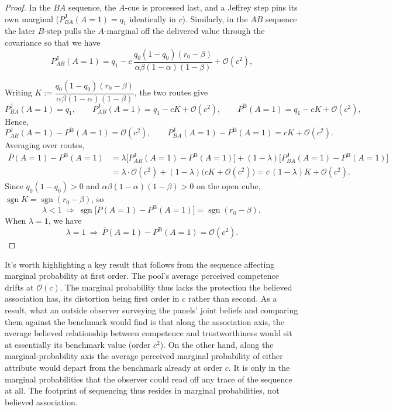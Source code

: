 \documentclass[a4paper,fleqn]{cas-sc}
\theoremstyle{remark}
\theoremstyle{definition}
\newcommand{\PB}{P^{\mathrm{B}}}
\newcommand{\PJ}{P^{\mathrm{J}}}
\newcommand{\Pbar}{\overline{P}}
\newcommand{\sgn}{\operatorname{sgn}}
\newcommand{\bigO}{\mathcal{O}}
\begin{document}
\begin{proof}
In the $BA$ sequence, the $A$-cue is processed last, and a Jeffrey step pins its own marginal ($\PJ_{BA}(A{=}1)=q_{1}$ identically
in $c$). Similarly, in the $AB$ sequence the later $B$-step pulls the $A$-marginal off the delivered value
through the covariance so that we have
\[
  \PJ_{AB}(A{=}1)=q_{1}-c\,\frac{q_{0}(1-q_{0})(r_{0}-\beta)}{\alpha\beta(1-\alpha)(1-\beta)}
  +\bigO(c^{2}),
\]

Writing $K:=\dfrac{q_0(1-q_0)(r_0-\beta)}{\alpha\beta(1-\alpha)(1-\beta)}$, the two routes give
\[
  \PJ_{BA}(A{=}1)=q_1,
  \qquad
  \PJ_{AB}(A{=}1)=q_1-cK+\bigO(c^2),
  \qquad
  \PB(A{=}1)=q_1-cK+\bigO(c^2),
\]
Hence,
\[
  \PJ_{AB}(A{=}1)-\PB(A{=}1)=\bigO(c^2),
  \qquad
  \PJ_{BA}(A{=}1)-\PB(A{=}1)=cK+\bigO(c^2).
\]
Averaging over routes,
\begin{align*}
  \Pbar(A{=}1)-\PB(A{=}1)
   &=\lambda\bigl[\PJ_{AB}(A{=}1)-\PB(A{=}1)\bigr]+(1-\lambda)\bigl[\PJ_{BA}(A{=}1)-\PB(A{=}1)\bigr]\\
   &=\lambda\cdot\bigO(c^2)+(1-\lambda)\bigl(cK+\bigO(c^2)\bigr)
    =c\,(1-\lambda)K+\bigO(c^2).
\end{align*}
Since $q_0(1-q_0)>0$ and $\alpha\beta(1-\alpha)(1-\beta)>0$ on the open cube, $\sgn K=\sgn(r_0-\beta)$, so
\[
  \lambda<1
  \ \Longrightarrow\
  \sgn\bigl[\Pbar(A{=}1)-\PB(A{=}1)\bigr]=\sgn(r_0-\beta),
  \]
  When $\lambda = 1$, we have
 \[
  \lambda=1
  \ \Longrightarrow\
  \Pbar(A{=}1)-\PB(A{=}1)=\bigO(c^2).
\]

\end{proof}

It's worth highlighting a key result that follows from the sequence affecting marginal probability at first order. The pool's average perceived competence drifts at $\bigO(c)$. The marginal probability thus lacks the protection the believed association has, its distortion being first order in $c$ rather than second. As a result, what an outside observer surveying the panels' joint beliefs and comparing them against the benchmark would find is that along the association axis, the average believed relationship between competence and trustworthiness would sit at essentially its benchmark value (order $c^{2}$). On the other hand, along the marginal-probability axis the average perceived marginal probability of either attribute would depart from the benchmark already at order $c$. It is only in the marginal probabilities that the observer could read off any trace of the sequence at all. The footprint of sequencing thus resides in marginal probabilities, not believed association. 
\end{document}
